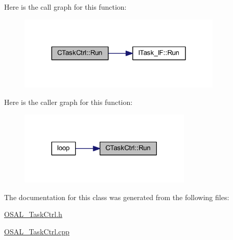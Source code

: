 Here is the call graph for this function\+:
\nopagebreak
\begin{figure}[H]
\begin{center}
\leavevmode
\includegraphics[width=276pt]{class_c_task_ctrl_ab36ffef43b3bd33303ed7d068b2e89cf_cgraph}
\end{center}
\end{figure}
Here is the caller graph for this function\+:
\nopagebreak
\begin{figure}[H]
\begin{center}
\leavevmode
\includegraphics[width=234pt]{class_c_task_ctrl_ab36ffef43b3bd33303ed7d068b2e89cf_icgraph}
\end{center}
\end{figure}


The documentation for this class was generated from the following files\+:\begin{DoxyCompactItemize}
\item 
\mbox{\hyperlink{_o_s_a_l___task_ctrl_8h}{O\+S\+A\+L\+\_\+\+Task\+Ctrl.\+h}}\item 
\mbox{\hyperlink{_o_s_a_l___task_ctrl_8cpp}{O\+S\+A\+L\+\_\+\+Task\+Ctrl.\+cpp}}\end{DoxyCompactItemize}
